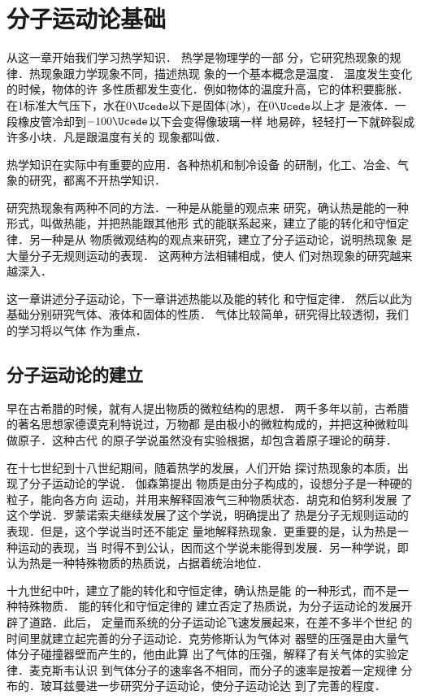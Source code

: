 \chapter{分子运动论基础}\label{chapter-foundations-of-molecular-kinematics}

从这一章开始我们学习热学知识．
热学是物理学的一部
分，它研究热现象的规律．热现象跟力学现象不同，描述热现
象的一个基本概念是温度．
温度发生变化的时候，物体的许
多性质都发生变化．例如物体的温度升高，它的体积要膨胀．
在1标准大气压下，水在0$\Ucede$以下是固体(冰)，在0$\Ucede$以上才
是液体．一段橡皮管冷却到$-100 \Ucede$以下会变得像玻璃一样
地易碎，轻轻打一下就碎裂成许多小块．凡是跟温度有关的
现象都叫做．

热学知识在实际中有重要的应用．各种热机和制冷设备
的研制，化工、冶金、气象的研究，都离不开热学知识．

研究热现象有两种不同的方法．一种是从能量的观点来
研究，确认热是能的一种形式，叫做热能，并把热能跟其他形
式的能联系起来，建立了能的转化和守恒定律．另一种是从
物质微观结构的观点来研究，建立了分子运动论，说明热现象
是大量分子无规则运动的表现．
这两种方法相辅相成，使人
们对热现象的研究越来越深入．

这一章讲述分子运动论，下一章讲述热能以及能的转化
和守恒定律．
然后以此为基础分别研究气体、液体和固体的性质．
气体比较简单，研究得比较透彻，我们的学习将以气体
作为重点．

\section{分子运动论的建立}
    早在古希腊的时候，就有人提出物质的微粒结构的思想．
两千多年以前，古希腊的著名思想家德谟克利特说过，万物都
是由极小的微粒构成的，并把这种微粒叫做原子．这种古代
的原子学说虽然没有实验根据，却包含着原子理论的萌芽．

    在十七世纪到十八世纪期间，随着热学的发展，人们开始
探讨热现象的本质，出现了分子运动论的学说．
伽森第提出
物质是由分子构成的，设想分子是一种硬的粒子，能向各方向
运动，并用来解释固液气三种物质状态．胡克和伯努利发展
了这个学说．罗蒙诺索夫继续发展了这个学说，明确提出了
热是分子无规则运动的表现．但是，这个学说当时还不能定
量地解释热现象．更重要的是，认为热是一种运动的表现，当
时得不到公认，因而这个学说未能得到发展．另一种学说，即
认为热是一种特殊物质的热质说，占据着统治地位．

   十九世纪中叶，建立了能的转化和守恒定律，确认热是能
的一种形式，而不是一种特殊物质．
能的转化和守恒定律的
建立否定了热质说，为分子运动论的发展开辟了道路．此后，
定量而系统的分子运动论飞速发展起来，在差不多半个世纪
的时间里就建立起完善的分子运动论．克劳修斯认为气体对
器壁的压强是由大量气体分子碰撞器壁而产生的，他由此算
出了气体的压强，解释了有关气体的实验定律．麦克斯韦认识
到气体分子的速率各不相同，而分子的速率是按着一定规律
分布的．玻耳兹曼进一步研究分子运动论，使分子运动论达
到了完善的程度．

